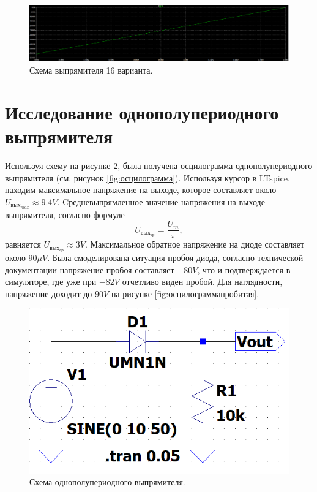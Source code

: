 \begin{figure}[htbp]
    \centering
    \includegraphics[width=1\linewidth]{figs/утечка_тока.png}
    \caption{Схема выпрямителя 16 варианта.}
    \label{fig:утечкатока}
\end{figure}



\section*{Исследование однополупериодного выпрямителя}

Используя схему на рисунке \ref{fig:схемаоднополупериодноговыпрямителя}, была получена 
осцилограмма однополупериодного выпрямителя (см. рисунок \ref{fig:осцилограмма}). 
Используя курсор в LTspice, находим максимальное напряжение на выходе, которое 
составляет около $U_{\text{вых}_{max}}\approx 9.4V$. 
Cредневыпрямленное значение напряжения на выходе выпрямителя, согласно формуле
$$
U_{\text{вых}_{\text{ср}}}=\frac{U_m}{\pi},
$$
равняется $U_{\text{вых}_{\text{ср}}}\approx 3V$.
Максимальное обратное напряжение на диоде составляет около $90\mu V$. Была смоделирована
ситуация пробоя диода, согласно технической документации напряжение пробоя составляет $-80V$,
что и подтверждается в симуляторе, где уже при $-82V$ отчетливо виден пробой. Для наглядности,
напряжение доходит до $90V$ на рисунке \ref{fig:осцилограммапробитая}.

\begin{figure}[htbp]
    \centering
    \includegraphics[width=0.5\linewidth]{figs/схема_однополупериодного_выпрямителя.png}
    \caption{Схема однополупериодного выпрямителя.}
    \label{fig:схемаоднополупериодноговыпрямителя}
\end{figure}

